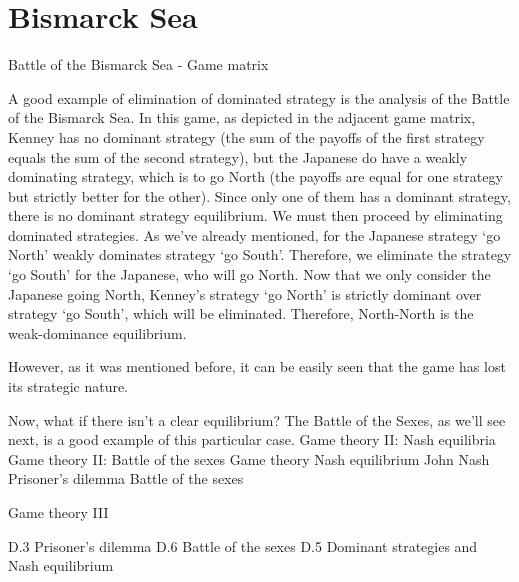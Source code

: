 \section{Bismarck Sea}
Battle of the Bismarck Sea - Game matrix

A good example of elimination of dominated strategy is the analysis of the Battle of the Bismarck Sea. In this game, as depicted in the adjacent game matrix, Kenney has no dominant strategy (the sum of the payoffs of the first strategy equals the sum of the second strategy), but the Japanese do have a weakly dominating strategy, which is to go North (the payoffs are equal for one strategy but strictly better for the other). Since only one of them has a dominant strategy, there is no dominant strategy equilibrium. We must then proceed by eliminating dominated strategies. As we’ve already mentioned, for the Japanese strategy ‘go North’ weakly dominates strategy ‘go South’. Therefore, we eliminate the strategy ‘go South’ for the Japanese, who will go North. Now that we only consider the Japanese going North, Kenney’s strategy ‘go North’ is strictly dominant over strategy ‘go South’, which will be eliminated. Therefore, North-North is the weak-dominance equilibrium.

However, as it was mentioned before, it can be easily seen that the game has lost its strategic nature.

Now, what if there isn’t a clear equilibrium? The Battle of the Sexes, as we’ll see next, is a good example of this particular case.
	Game theory II: Nash equilibria Game theory II: Battle of the sexes 
Game theory
Nash equilibrium
John Nash
Prisoner’s dilemma
Battle of the sexes
 
Game theory III
 
D.3 Prisoner’s dilemma
D.6 Battle of the sexes
D.5 Dominant strategies and Nash equilibrium



